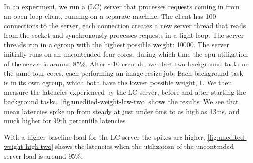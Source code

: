 In an experiment, we run a (LC) server that processes requests coming in from an
open loop client, running on a separate machine. The client has 100 connections
to the server, each connection creates a new server thread that reads from the
socket and synchronously processes requests in a tight loop. The server threads
run in a cgroup with the highest possible weight: 10000. The server initially
runs on an uncontended four cores, during which time the cpu utilization of the
server is around 85\%. After $\sim$10 seconds, we start two background tasks on
the same four cores, each performing an image resize job. Each background task
is in its own cgroup, which both have the lowest possible weight, 1. We then
measure the latencies experienced by the LC server, before and after starting
the background tasks.\ \autoref{fig:unedited-weight-low-two} shows the results.
We see that mean latencies spike up from steady at just under 6ms to as high as
13ms, and much higher for 99th percentile latencies.

With a higher baseline load for the LC server the spikes are higher,
\autoref{fig:unedited-weight-high-two} shows the latencies when the utilization
of the uncontended server load is around 95\%.
